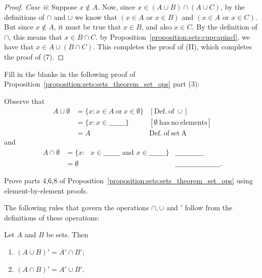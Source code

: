 \begin{proof}
\noindent
\emph{Case ii}:  Suppose $x \not\in  A$. Now, since $x \in (A \cup B) \cap (A \cup C)$, by the definitions of $\cap$ and $\cup$ we know that $(x \in A \text{ or } x \in B)$ and $(x \in A \text{ or } x \in C)$. But since  $x \not\in  A$, it must be true that $x\in B$, and also $x\in C$. By the definition of $\cap$, this means that $x\in B \cap C$. by Proposition~\ref{proposition:sets:cupcapincl}, we have that  $x \in A \cup (B \cap C)$. This completes the proof of (II), which completes the proof of (7).
\end{proof}

\begin{exercise}
Fill in the blanks in the following proof of Proposition~\ref{proposition:sets:sets_theorem_set_ops} part (3):

\medskip{}
\noindent
Observe that
\begin{align*}
A \cup \emptyset & =  \{ x : x \in A \mathrm{~or~}x \in \emptyset \}    & [\mathrm{Def.~of~}\cup] \\
& = \{ x : x \in \_\_\_\_\_\_\_ \}     & [\emptyset \mathrm{~has~no~elements}] \\
& =  A & \mathrm{Def.~of~set~A} 
\end{align*}
and
\begin{align*}
A \cap \emptyset & =  \{ x : \mbox{ $x \in \_\_\_\_\_\_\_$ and $x \in \_\_\_\_\_\_\_$} \}     & \_\_\_\_\_\_\_\_\_\_\_\_ \\
& =  \emptyset     & \_\_\_\_\_\_\_\_\_\_\_\_\_\_\_\_\_\_\_ .
\end{align*}
\end{exercise}

\begin{exercise}\label{exercise:sets:26}
Prove parts 4,6,8 of Proposition~\ref{proposition:sets:sets_theorem_set_ops} using element-by-element proofs.
\end{exercise}

\medskip{}
\noindent
The following rules that govern the operations $\cap, \cup$ and $'$  follow from the definitions of these operations:

\begin{thm}\label{sets_de_morgan}
Let $A$ and $B$ be sets. Then 
\begin{enumerate}[(1)]
 \item
$(A \cup B)' = A' \cap B'$; 
 \item
$(A \cap B)' = A' \cup B'$.
 \end{enumerate}
\end{thm}
 
